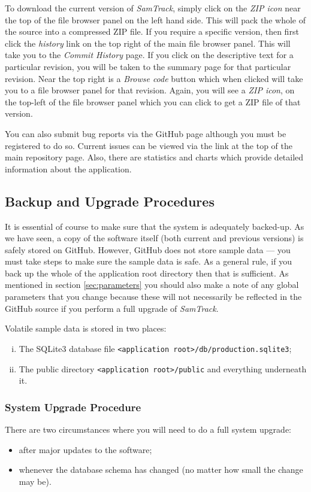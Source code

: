 \documentclass[12pt,twoside]{article}
\newcommand{\samtrack}{\emph{SamTrack}}
\begin{document}
To download the current version of \samtrack, simply click on the
\emph{ZIP icon} near the top of the file browser panel on the left hand side. 
This will
pack the whole of the source into a compressed ZIP file. If you
require a specific version, then first click the \emph{history} link on the
top right of the main file browser panel. This will take you to the
\emph{Commit History} page. If you click on the descriptive text for
a particular revision, you will be taken to the summary page for that
particular revision. Near the top right is a \emph{Browse code} button
which when clicked will take you to a file browser panel for that revision.
Again, you will see a \emph{ZIP icon}, on the top-left of the file browser
panel which you can click to get a ZIP file of that version.

You can also submit bug reports via the GitHub page although you must
be registered to do so. Current issues can be viewed via the link at
the top of the main repository page.
Also, there are statistics and charts which provide detailed information
about the application.

\subsection{Backup and Upgrade Procedures}
It is essential of course to make sure that the system is adequately
backed-up. As we have seen, a copy of the software itself (both current
and previous versions) is safely stored on GitHub. However, GitHub
does not store sample data --- you must take steps to make sure the
sample data is safe. As a general rule, if you back up the whole of the
application root directory then that is sufficient. 
As mentioned in section \ref{sec:parameters} you should also make
a note of any global parameters that you change because these will
not necessarily be reflected in the GitHub source if you perform
a full upgrade of \samtrack. 

Volatile sample data is stored in two places:
\begin{enumerate}[(i)]
\item
The SQLite3 database file
\verb=<application root>/db/production.sqlite3=;
\item
The public directory
\verb=<application root>/public= and everything underneath it.
\end{enumerate}

\subsubsection{System Upgrade Procedure}\label{sec:upgrade}
There are two circumstances where you will need to do a full system upgrade:
\begin{itemize}
\item
after major updates to the software;
\item
whenever the database schema has changed (no matter how small the change
may be).
\end{itemize}
\end{document}
